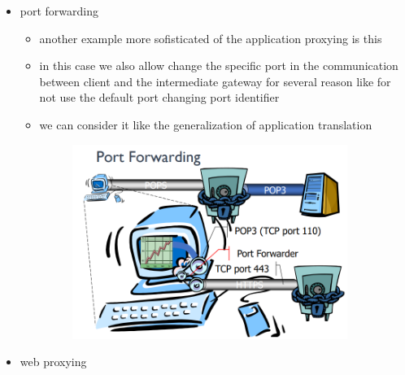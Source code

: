 \documentclass{article}
\begin{document}
\begin{itemize}
\begin{itemize}
\begin{itemize}
\begin{itemize}
\begin{figure}[h]
                \end{figure}
            \end{itemize}           
            \item port forwarding
            \begin{itemize}
                \item another example more sofisticated of the application proxying is this
                \item in this case we also allow change the specific port in the communication between client and the intermediate gateway for several reason like for not use the default port changing port identifier
                \item we can consider it like the generalization of application translation 
                \begin{figure}[h]
                    \centering
                    \includegraphics[width=0.90\textwidth]{figure/port_forwarding.png}
                \end{figure}
            \end{itemize}            
            \item web proxying
        \end{itemize}
    \end{itemize}    
\end{itemize}
\end{document}
